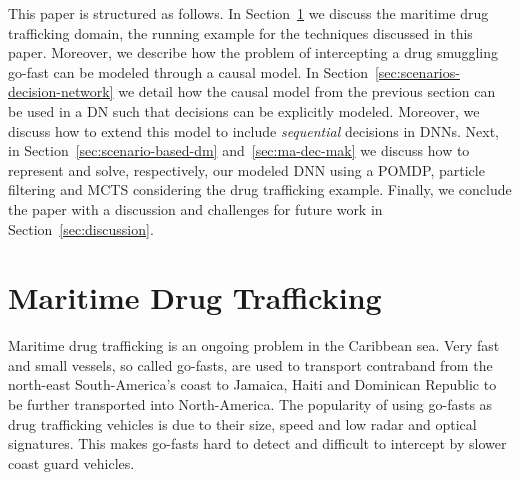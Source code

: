 \documentclass[conference]{IEEEtran}
\begin{document}
This paper is structured as follows. In Section~\ref{sec:maritime-drug-trafficking} we discuss the maritime drug trafficking domain, the running example for the techniques discussed in this paper. Moreover, we describe how the problem of intercepting a drug smuggling go-fast can be modeled through a causal model. In Section~\ref{sec:scenarios-decision-network} we detail how the causal model from the previous section can be used in a DN such that decisions can be explicitly modeled. Moreover, we discuss how to extend this model to include \emph{sequential} decisions in DNNs. Next, in Section~\ref{sec:scenario-based-dm} and~\ref{sec:ma-dec-mak} we discuss how to represent and solve, respectively, our modeled DNN using a POMDP, particle filtering and MCTS considering the drug trafficking example. Finally, we conclude the paper with a discussion and challenges for future work in Section~\ref{sec:discussion}.

\section{Maritime Drug Trafficking}\label{sec:maritime-drug-trafficking}

Maritime drug trafficking is an ongoing problem in the Caribbean sea. Very fast and small vessels, so called go-fasts, are used to transport contraband from the north-east South-America's coast to Jamaica, Haiti and Dominican Republic to be further transported into North-America. The popularity of using go-fasts as drug trafficking vehicles is due to their size, speed and low radar and optical signatures. This makes go-fasts hard to detect and difficult to intercept by slower coast guard vehicles. 
\end{document}

